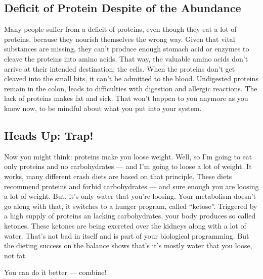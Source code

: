 \documentclass[../main.tex]{subfiles}
\begin{document}
    \subsection{Deficit of Protein Despite of the Abundance}

    Many people suffer from a deficit of proteins, even though they eat a lot of proteins, because they nourish themselves the wrong way.
    Given that vital substances are missing, they can't produce enough stomach acid or enzymes to cleave the proteins into amino acids.
    That way, the valuable amino acids don't arrive at their intended destination: the cells.
    When the proteins don't get cleaved into the small bits, it can't be admitted to the blood.
    Undigested proteins remain in the colon, leads to difficulties with digestion and
    allergic reactions.
    The lack of proteins makes fat and sick.
    That won't happen to you anymore as you know now, to be mindful about what you put into your system.

    \subsection{Heads Up: Trap!}

    Now you might think: proteins make you loose weight.
    Well, so I'm going to eat only proteins and no carbohydrates --- and I'm going to loose a lot of weight. 
    It works, many different crash diets are based on that principle.
    These diets recommend proteins and forbid carbohydrates --- and sure enough you are loosing a lot of weight.
    But, it's only water that you're loosing.
    Your metabolism doesn't go along with that, it switches to a hunger program, called ``ketose''.
    Triggered by a high supply of proteins an lacking carbohydrates, your body produces so called ketones.
    These ketones are being excreted over the kidneys along with a lot of water.
    That's not bad in itself and is part of your biological programming.
    But the dieting success on the balance shows that's it's mostly water that you loose, not fat.

    You can do it better --- combine!
\end{document}

